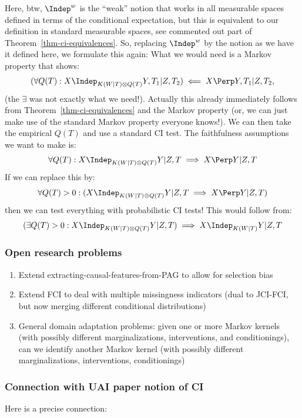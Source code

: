 Here, btw, $\Indep^w$ is the ``weak'' notion that works in all measurable spaces defined in terms of the conditional expectation,
but this is equivalent to our definition in standard measurable spaces, see commented out part of Theorem~\ref{thm-ci-equivalences}.
So, replacing $\Indep^w$ by the notion as we have it defined here, we formulate this again:
What we would need is a Markov property that shows:
$$(\forall Q(T) : X \Indep_{K(W|T)\otimes Q(T)} Y,T_1 | Z,T_2) \impliedby X \Perp Y,T_1 | Z,T_2,$$
(the $\exists$ was not exactly what we need!). 
Actually this already immediately follows from Theorem~\ref{thm-ci-equivalences} and the Markov property
(or, we can just make use of the standard Markov property everyone knows!).
We can then take the empirical $Q(T)$ and use a standard CI test.
The faithfulness assumptions we want to make is:
$$\forall Q(T) : X \Indep_{K(W|T)\otimes Q(T)} Y | Z,T \implies X \Perp Y | Z,T$$
If we can replace this by:
$$\forall Q(T) > 0 : (X \Indep_{K(W|T)\otimes Q(T)} Y | Z,T \implies X \Perp Y | Z,T)$$
then we can test everything with probabilistic CI tests!
This would follow from:
$$(\exists Q(T) > 0 : X \Indep_{K(W|T)\otimes Q(T)} Y | Z,T) \implies X \Indep_{K(W|T)} Y | Z,T$$

\subsubsection{Open research problems}

\begin{enumerate}
  \item Extend extracting-causal-features-from-PAG to allow for selection bias
  \item Extend FCI to deal with multiple missingness indicators (dual to JCI-FCI, but now merging different conditional distributions)
  \item General domain adaptation problems: given one or more Markov kernels (with possibly different marginalizations, interventions, and conditionings), can we identify another Markov kernel (with possibly different marginalizations, interventions, conditionings)
\end{enumerate}


\subsubsection{Connection with UAI paper notion of CI}

Here is a precise connection:

